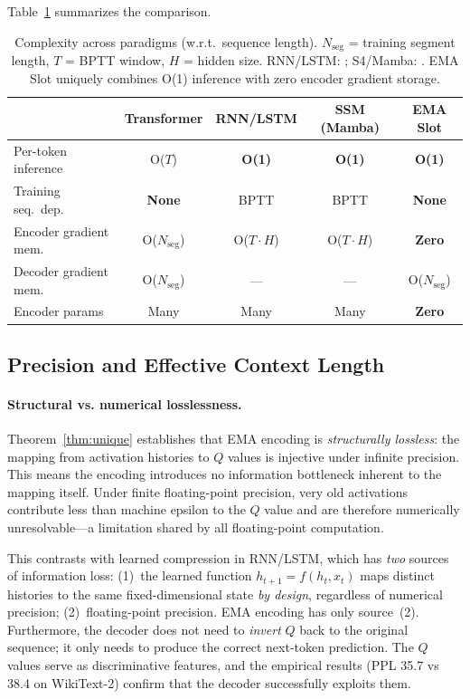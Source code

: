 \documentclass[11pt]{article}
\begin{document}
Table~\ref{tab:complexity} summarizes the comparison.

\begin{table}[ht]
\centering
\small
\begin{tabular}{l c c c c}
\toprule
& Transformer & RNN/LSTM & SSM (Mamba) & \textbf{EMA Slot} \\
\midrule
Per-token inference & O($T$) & \textbf{O(1)} & \textbf{O(1)} & \textbf{O(1)} \\
Training seq.\ dep. & \textbf{None} & BPTT & BPTT & \textbf{None} \\
Encoder gradient mem. & O($N_{\text{seg}}$) & O($T \cdot H$) & O($T \cdot H$) & \textbf{Zero} \\
Decoder gradient mem. & O($N_{\text{seg}}$) & --- & --- & O($N_{\text{seg}}$) \\
Encoder params & Many & Many & Many & \textbf{Zero} \\
\bottomrule
\end{tabular}
\caption{Complexity across paradigms (w.r.t.\ sequence length). $N_{\text{seg}}$ = training segment length, $T$ = BPTT window, $H$ = hidden size. RNN/LSTM: \cite{goodfellow2016}; S4/Mamba: \cite{gu2022,gu2023}. EMA Slot uniquely combines O(1) inference with zero encoder gradient storage.}
\label{tab:complexity}
\end{table}

\subsection{Precision and Effective Context Length}
\label{sec:precision}

\paragraph{Structural vs. numerical losslessness.}
Theorem~\ref{thm:unique} establishes that EMA encoding is \emph{structurally lossless}: the mapping from activation histories to $Q$ values is injective under infinite precision. This means the encoding introduces no information bottleneck inherent to the mapping itself. Under finite floating-point precision, very old activations contribute less than machine epsilon to the $Q$ value and are therefore numerically unresolvable---a limitation shared by all floating-point computation.

This contrasts with learned compression in RNN/LSTM, which has \emph{two} sources of information loss: (1)~the learned function $h_{t+1} = f(h_t, x_t)$ maps distinct histories to the same fixed-dimensional state \emph{by design}, regardless of numerical precision; (2)~floating-point precision. EMA encoding has only source~(2). Furthermore, the decoder does not need to \emph{invert} $Q$ back to the original sequence; it only needs to produce the correct next-token prediction. The $Q$ values serve as discriminative features, and the empirical results (PPL 35.7 vs 38.4 on WikiText-2) confirm that the decoder successfully exploits them.
\end{document}
